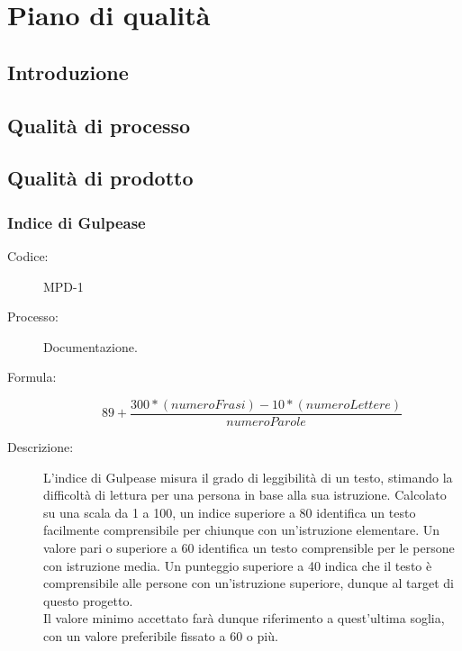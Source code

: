\chapter{Piano di qualità}

\section{Introduzione}

\section{Qualità di processo}

\section{Qualità di prodotto} \label{sec:qualityprod}
\subsection{Indice di Gulpease}
\begin{description}
    \item[Codice:] MPD-1
    \item[Processo:] Documentazione.
    \item[Formula:] 
    \begin{equation}
    89 +
    \frac{300 * (numeroFrasi) - 10 * (numeroLettere)}{numeroParole}
    \label{MPD-1}
    \end{equation}
    \item[Descrizione:] L'indice di Gulpease misura il grado di leggibilità di un testo, stimando la difficoltà di lettura per una persona in base alla sua istruzione. Calcolato su una scala da 1 a 100, un indice superiore a 80 identifica un testo facilmente comprensibile per chiunque con un'istruzione elementare. Un valore pari o superiore a 60 identifica un testo comprensible per le persone con istruzione media. Un punteggio superiore a 40 indica che il testo è comprensibile alle persone con un'istruzione superiore, dunque al target di questo progetto.\\Il valore minimo accettato farà dunque riferimento a quest'ultima soglia, con un valore preferibile fissato a 60 o più.
\end{description}

